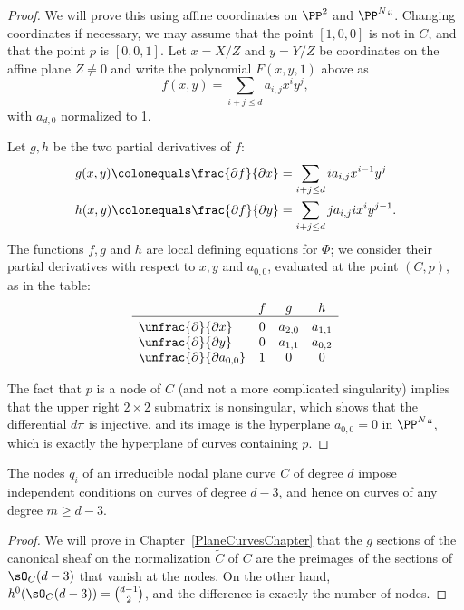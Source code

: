 \begin{proof}
We will prove this using affine coordinates on $\PP^2$ and $\PP^N` `$.
Changing coordinates if necessary, we may assume that the point
$[1,0,0]$ is not in $C$, and that the point $p$ is $[0,0,1]$. 
Let $x = X/Z$ and $y = Y/Z$ be coordinates on the affine plane $Z \neq 0$ and
write the polynomial $F(x,y,1)$ above as
$$
f(x,y) = \sum_{i+j \leq d} a_{i,j} x^iy^j
,
$$
with $a_{d,0}$ normalized to 1.

Let $g,h$ be the two partial derivatives of $f$:
\begin{align*}
 g(x,y) \colonequals  \frac{\partial f}{\partial x} &= \sum_{i+j \leq d} i a_{i,j} x^{i-1}y^j\\
h(x,y) \colonequals  \frac{\partial f}{\partial y} &= \sum_{i+j \leq d} j a_{i,j} ix^{i}y^{j-1}.
\end{align*}
The functions $f, g$ and $h$ are local defining equations for $\Phi$;
we consider their partial derivatives with respect to $x, y$ and
$a_{0,0}$, evaluated at the point $(C,p)$, as in 
the table:
$$
     \begin{array}{lccc} %
            & f & g & h \\
      \hline
\vbox to 11pt{} %
\unfrac{\partial}{\partial x} & 0 & a_{2,0} & a_{1,1} \\
\unfrac{\partial}{\partial y} & 0 & a_{1,1} & a_{0,2} \\
\unfrac{\partial}{\partial a_{0,0}} & 1 & 0 & 0
    \end{array}
$$

The fact that $p$ is a node of $C$ (and not a more complicated singularity) implies that the upper right $2 \times 2$ submatrix is nonsingular, which shows that the differential $d\pi$ is injective, and its image is the hyperplane $a_{0,0} = 0$ in $\PP^N` `$, which is exactly the hyperplane of curves containing $p$.
\end{proof}

\begin{lemma}\label{adjoint independent}
The nodes $q_i$ of an irreducible nodal plane curve $C$ of degree $d$
%
%
impose independent conditions on curves of degree $d-3$, and hence on
curves of any degree $m \geq d-3$.
\end{lemma}

\begin{proof}
We will prove in Chapter~\ref{PlaneCurvesChapter} that the $g$ sections of the canonical sheaf on the normalization $\widetilde C$ of
$C$ are the preimages of the sections of $\sO_C(d-3)$ that vanish at the nodes. On the other hand,
$h^0(\sO_C(d-3)) = \tbinom{d-1}{2}$, and the difference is exactly the number of nodes.
\end{proof}

